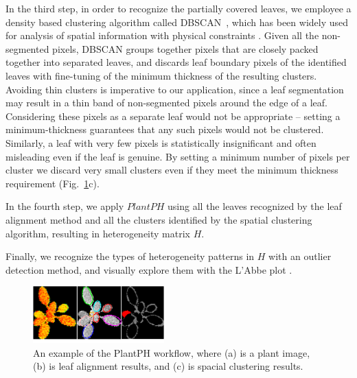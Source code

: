 \documentclass{bioinfo}
\begin{document}
\begin{methods}
In the third step, in order to recognize the partially covered leaves, we employee a density based clustering algorithm called DBSCAN~\citep{ester1996density,kriegel2011density}, which has been widely used for analysis of spatial information with physical constraints \citep{zaiane2002clustering}. Given all the non-segmented pixels, DBSCAN groups together pixels that are closely packed together into separated leaves, and discards leaf boundary pixels of the identified leaves with fine-tuning of the minimum thickness of the resulting clusters. Avoiding thin clusters is imperative to our application, since a leaf segmentation may result in a thin band of non-segmented pixels around the edge of a leaf. Considering these pixels as a separate leaf would not be appropriate -- setting a minimum-thickness guarantees that any such pixels would not be clustered. Similarly, a leaf with very few pixels is statistically insignificant and often misleading even if the leaf is genuine. By setting a minimum number of pixels per cluster we discard very small clusters even if they meet the minimum thickness requirement (Fig.~\ref{fig:example}c).

In the fourth step, we apply $PlantPH$  using all the leaves recognized by the leaf alignment method and all the clusters identified by the spatial clustering algorithm, resulting in heterogeneity matrix $H$.

Finally, we recognize the types of heterogeneity patterns in $H$ with an outlier detection method, and visually explore them with the L'Abbe plot \citep{song1999exploring}.

%
%
%

\begin{figure}
  \centering
  \includegraphics[width=0.45\textwidth]{workflowexample.png}\vspace{-0.2in}
  \caption{An example of the PlantPH workflow, where (a) is a plant image, (b) is leaf alignment results, and (c) is spacial clustering results.}\label{fig:example}\vspace{-0.2in}
\end{figure}

\end{methods}
\end{document}
